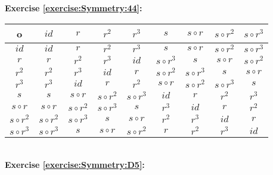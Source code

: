 \noindent\textbf{Exercise \ref{exercise:Symmetry:44}:}\\
	\begin{tabular}{c| c c c c c c c c }
		o & $id$ & $r$ & $r^2$ & $r^3$ & $s$ & $s\circ r$ & $s\circ r^2$ & $s\circ r^3$\\
		\hline
		$id$ & $id$ & $r$ & $r^2$ & $r^3$ & $s$ & $s\circ r$ & $s\circ r^2$ & $s\circ r^3$\\
		$r$ & $r$ & $r^2$ & $r^3$ & $id$ & $s\circ r^3$ & $s$ & $s\circ r$ & $s\circ r^2$\\
		$r^2$ & $r^2$ & $r^3$ & $id$ & $r$ & $s\circ r^2$ & $s\circ r^3$ & $s$ & $s\circ r$\\
		$r^3$ & $r^3$ & $id$ & $r$ & $r^2$ & $s\circ r$ & $s\circ r^2$ & $s\circ r^3$ & $s$\\
		$s$ & $s$ & $s\circ r$ & $s\circ r^2$ & $s\circ r^3$ & $id$ & $r$ & $r^2$ & $r^3$\\
		$s\circ r$ & $s\circ r$ & $s\circ r^2$ & $s\circ r^3$ & $s$ & $r^3$ & $id$ & $r$ & $r^2$\\
		$s\circ r^2$ & $s\circ r^2$ & $s\circ r^3$ & $s$ & $s\circ r$ & $r^2$ & $r^3$ & $id$ & $r$\\
		$s\circ r^3$ & $s\circ r^3$ & $s$ & $s\circ r$ & $s\circ r^2$ & $r$ & $r^2$ & $r^3$ & $id$
	\end{tabular}
\\

\noindent\textbf{Exercise \ref{exercise:Symmetry:D5}:}
\\

